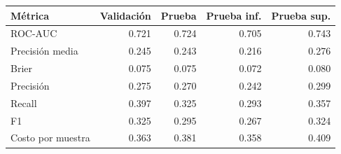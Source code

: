 \begin{tabular}{lrrrr}
\toprule
Métrica & Validación & Prueba & Prueba inf. & Prueba sup. \\
\midrule
ROC-AUC & 0.721 & 0.724 & 0.705 & 0.743 \\
Precisión media & 0.245 & 0.243 & 0.216 & 0.276 \\
Brier & 0.075 & 0.075 & 0.072 & 0.080 \\
Precisión & 0.275 & 0.270 & 0.242 & 0.299 \\
Recall & 0.397 & 0.325 & 0.293 & 0.357 \\
F1 & 0.325 & 0.295 & 0.267 & 0.324 \\
Costo por muestra & 0.363 & 0.381 & 0.358 & 0.409 \\
\bottomrule
\end{tabular}
